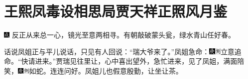 

\chapter{王熙凤毒设相思局\hspace{.5em}贾天祥正照风月鉴}

{\includegraphics[width=3mm]{../Images/00005}  \kaishu  反正从来总一心，镜光至意两相寻。有朝敲破蒙头瓮，绿水青山任好春。}

话说凤姐正与平儿说话，只见有人回说：``瑞大爷来了。''凤姐急命：{\includegraphics[width=3mm]{../Images/00004}\includegraphics[width=3mm]{../Images/00011}\footnotesize \kaishu 立意追命。}``快请进来。''贾瑞见往里让，心中喜出望外，急忙进来，见了凤姐，满面陪笑，{\includegraphics[width=3mm]{../Images/00004}\includegraphics[width=3mm]{../Images/00011}\footnotesize \kaishu 如蛇。}连连问好。凤姐儿也假意殷勤，让坐让茶。

